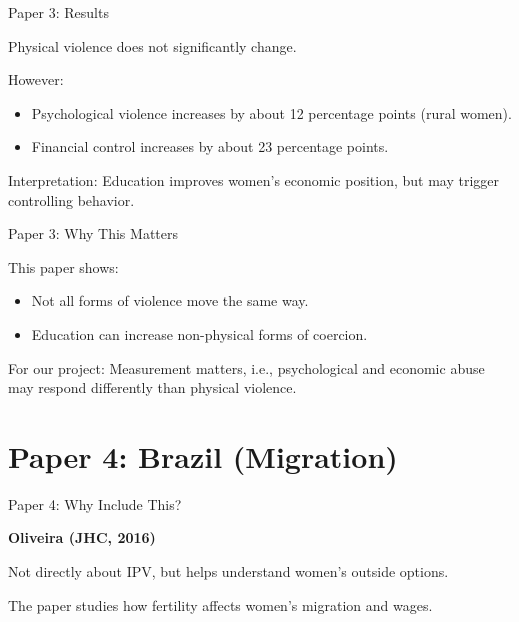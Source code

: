 \documentclass[11pt,aspectratio=169]{beamer}
\begin{document}
\begin{frame}{Paper 3: Results}

Physical violence does not significantly change.

However:

\begin{itemize}
    \item Psychological violence increases by about 12 percentage points (rural women).
    \item Financial control increases by about 23 percentage points.
\end{itemize}

\medskip

Interpretation:
Education improves women’s economic position,
but may trigger controlling behavior.

\end{frame}

\begin{frame}{Paper 3: Why This Matters}

This paper shows:

\begin{itemize}
    \item Not all forms of violence move the same way.
    \item Education can increase non-physical forms of coercion.
\end{itemize}

For our project:
Measurement matters, i.e., psychological and economic abuse
may respond differently than physical violence.

\end{frame}

\section{Paper 4: Brazil (Migration)}

\begin{frame}{Paper 4: Why Include This?}

\textbf{Oliveira (JHC, 2016)}

\medskip

Not directly about IPV,
but helps understand women’s outside options.

\medskip

The paper studies how fertility affects women’s migration
and wages.

\end{frame}
\end{document}
